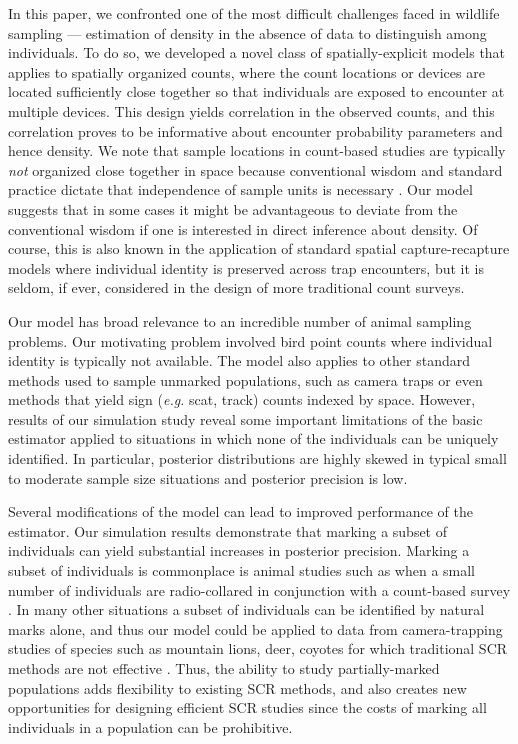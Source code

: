 In this paper, we confronted one of the most difficult challenges
faced in wildlife sampling ---
estimation of density in the absence of data to distinguish among
individuals. To do so, we developed a novel class of
spatially-explicit models that
applies to spatially organized counts, where the count locations or
devices are located sufficiently close together so that individuals
are exposed to encounter at multiple devices. This design yields
correlation in the observed counts, and this correlation proves to be
informative about encounter probability parameters and hence density.
We note that sample locations in count-based studies are typically
{\it not} organized close
together in space because conventional wisdom and standard practice
dictate that independence of sample units is necessary
\citep{hurlbert:1984}. Our model
suggests that in some cases it might be advantageous to deviate from
the conventional wisdom if one is interested in direct inference about
density. Of course, this is also known in the application of standard spatial
capture-recapture  models \citep{borchers_efford:2008}
where individual
identity is preserved across trap encounters, but it is seldom, if
ever, considered in the design of more traditional count surveys.

Our model has broad relevance to an incredible number of animal
sampling problems. Our motivating problem involved bird point counts
where individual
identity is typically not available. The model also applies
to other standard methods used to sample unmarked
populations,  such as camera traps
or even methods that yield sign ({\it e.g.} scat, track) counts
indexed by space. However, results of our simulation study reveal some
important limitations of the basic
estimator applied to situations in which none of the individuals can
be uniquely identified. In particular, posterior
distributions are highly skewed in typical small to moderate sample
size situations and posterior precision is low.

Several modifications of the model can lead to improved
performance of the estimator.
Our simulation results demonstrate that marking a subset of
individuals can yield substantial increases in posterior
precision. Marking a subset of individuals is
commonplace is animal studies such as when a small number of individuals are
radio-collared in conjunction with a count-based survey
\citep{bartmann_etal:1987}. In many other situations a subset of
individuals can be identified by natural marks alone, and thus our
model could be applied to data from camera-trapping studies of
species such as mountain lions, deer, coyotes for which traditional
SCR methods are not effective \citep{kelly_etal:2008}.
Thus, the ability to study partially-marked populations
adds flexibility to existing SCR methods, and also
creates new opportunities for designing efficient SCR studies
since the costs of marking all individuals in a population can be
prohibitive.

